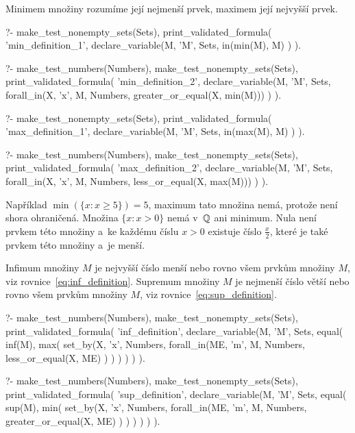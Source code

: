 Minimem množiny rozumíme její nejmenší prvek, maximem její nejvyšší prvek.

\begin{fact}
\begin{prolog}
?-	make_test_nonempty_sets(Sets),
	print_validated_formula(
		'min_definition_1',
		declare_variable(M, 'M', Sets,
			in(min(M), M)
		)
	).
\end{prolog}
\begin{prolog}
?-	make_test_numbers(Numbers),
	make_test_nonempty_sets(Sets),
	print_validated_formula(
		'min_definition_2',
		declare_variable(M, 'M', Sets,
			forall_in(X, 'x', M, Numbers, greater_or_equal(X, min(M)))
		)
	).
\end{prolog}
\begin{prolog}
?-	make_test_nonempty_sets(Sets),
	print_validated_formula(
		'max_definition_1',
		declare_variable(M, 'M', Sets,
			in(max(M), M)
		)
	).
\end{prolog}
\begin{prolog}
?-	make_test_numbers(Numbers),
	make_test_nonempty_sets(Sets),
	print_validated_formula(
		'max_definition_2',
		declare_variable(M, 'M', Sets,
			forall_in(X, 'x', M, Numbers, less_or_equal(X, max(M)))
		)
	).
\end{prolog}
\end{fact}

Například \(\min(\{x: x \geq 5\}) = 5\), maximum tato množina nemá, protože není shora ohraničená. Množina \(\{x: x > 0\}\) nemá v~\(\mathbb{Q}\) ani minimum. Nula není prvkem této množiny a~ke každému číslu \(x > 0\) existuje číslo \(\frac{x}{2}\), které je také prvkem této množiny a~je menší.

Infimum množiny \(M\) je nejvyšší číslo menší nebo rovno všem prvkům množiny \(M\), viz rovnice~\eqref{eq:inf_definition}. Supremum množiny \(M\) je nejmenší číslo větší nebo rovno všem prvkům množiny \(M\), viz rovnice~\eqref{eq:sup_definition}. 

\begin{fact}
\begin{prolog}
?-	make_test_numbers(Numbers),
	make_test_nonempty_sets(Sets),
	print_validated_formula(
		'inf_definition',
		declare_variable(M, 'M', Sets,
			equal(
				inf(M),
				max(
					set_by(X, 'x', Numbers, 
						forall_in(ME, 'm', M, Numbers,
							less_or_equal(X, ME)
						)
					)
				)
			)
		)
	).
\end{prolog}
\begin{prolog}
?-	make_test_numbers(Numbers),
	make_test_nonempty_sets(Sets),
	print_validated_formula(
		'sup_definition',
		declare_variable(M, 'M', Sets,
			equal(
				sup(M),
				min(
					set_by(X, 'x', Numbers, 
						forall_in(ME, 'm', M, Numbers,
							greater_or_equal(X, ME)
						)
					)
				)
			)
		)
	).
\end{prolog}
\end{fact}

